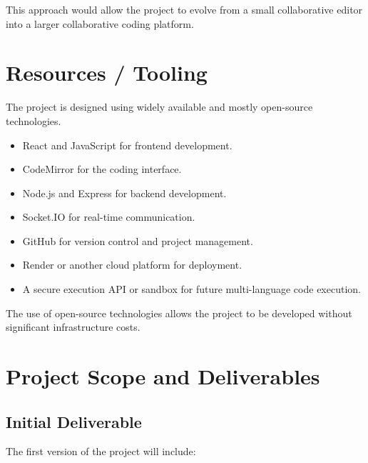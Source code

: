 \documentclass[11pt,letterpaper]{article}
\begin{document}
This approach would allow the project to evolve from a small collaborative editor into a larger collaborative coding platform.



\section{Resources / Tooling}

The project is designed using widely available and mostly open-source technologies.

\begin{itemize}
    \item React and JavaScript for frontend development.
    
    \item CodeMirror for the coding interface.
    
    \item Node.js and Express for backend development.
    
    \item Socket.IO for real-time communication.
    
    \item GitHub for version control and project management.
    
    \item Render or another cloud platform for deployment.
    
    \item A secure execution API or sandbox for future multi-language code execution.
\end{itemize}

The use of open-source technologies allows the project to be developed without significant infrastructure costs.



\newpage

\section{Project Scope and Deliverables}

\subsection{Initial Deliverable}

The first version of the project will include:
\end{document}
